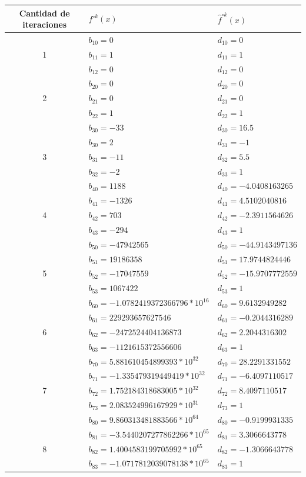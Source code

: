 \documentclass[oneside,11pt]{book}
\theoremstyle{definition}
\theoremstyle{plain}
\theoremstyle{remark}
\begin{document}
\begin{center}
\begin{tabular}{ |c | l | l | }
\hline
 Cantidad de iteraciones & $f^{\circ k}(x)$ & $\hat{f}^{\circ k}(x)$\\
 \hline 
& $b_{10}= 0$ & $d_{10}= 0 $\\
1 & $b_{11}= 1$ &$d_{11}=1 $  \\ 
& $b_{12}= 0$ & $d_{12}=0$\\  
 \hline 
& $b_{20}= 0$ & $d_{20}= 0 $\\
2 & $b_{21}= 0$ & $d_{21}=0 $  \\ 
& $b_{22}= 1$ & $d_{22}=1$\\
\hline
& $b_{30}= -33$ & $d_{30}= 16.5$\\
& $b_{30}= 2$ & $d_{31}= -1$\\
3 & $b_{31}= -11$ & $d_{32}=5.5$  \\ 
& $b_{32}= -2$ & $d_{33}=1$\\
\hline
& $b_{40}= 1188$ & $d_{40}= -4.0408163265$\\
& $b_{41}= -1326$ & $d_{41}= 4.5102040816$\\
4 & $b_{42}= 703$ & $d_{42}=-2.3911564626$  \\ 
& $b_{43}= -294$ & $d_{43}=1$\\
\hline
& $b_{50}= -47942565$ & $d_{50}=-44.9143497136$\\
& $b_{51}= 19186358$ & $d_{51}=17.9744824446$\\
5 & $b_{52}= -17047559$ & $d_{52}=-15.9707772559$  \\ 
& $b_{53}= 1067422$ & $d_{53}=1$\\
\hline
& $b_{60}= -1.0782419372366796*10^{16}$ & $d_{60}=9.6132949282$\\
& $b_{61}= 229293657627546$ & $d_{61}=-0.2044316289$\\
6 & $b_{62}= -2472524404136873$ & $d_{62}=2.2044316302$  \\ 
& $b_{63}= -1121615372556606$ & $d_{63}=1$\\
\hline
& $b_{70}= 5.881610454899393*10^{32}$ & $d_{70}=28.2291331552$\\
& $b_{71}= -1.335479319449419*10^{32}$ & $d_{71}=-6.4097110517$\\
7 & $b_{72}= 1.752184318683005*10^{32}$ & $d_{72}=8.4097110517$  \\ 
& $b_{73}= 2.083524996167929*10^{31}$ & $d_{73}=1$\\
\hline
& $b_{80}= 9.860313481883566*10^{64}$ & $d_{80}=-0.9199931335$\\
& $b_{81}= -3.5440207277862266*10^{65}$ & $d_{81}=3.3066643778$\\
8 & $b_{82}=1.4004583199705992*10^{65}$ & $d_{82}=-1.3066643778$  \\ 
& $b_{83}= -1.0717812039078138*10^{65}$ & $d_{83}=1$\\
\hline

\end{tabular}
\end{center}
\bigskip
\end{document}
